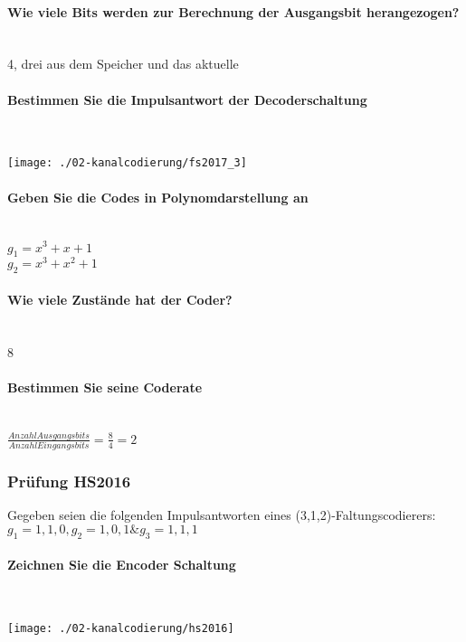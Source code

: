 \paragraph{Wie viele Bits werden zur Berechnung der Ausgangsbit herangezogen?}\mbox{}\\
4, drei aus dem Speicher und das aktuelle


\paragraph{Bestimmen Sie die Impulsantwort der Decoderschaltung}\mbox{}\\
\begin{center}
    \vspace{-8pt}
    \texttt{[image: ./02-kanalcodierung/fs2017\_3]}
    \vspace{-8pt}
\end{center}

\paragraph{Geben Sie die Codes in Polynomdarstellung an}\mbox{}\\
$g_1=x^3+x+1$\\
$g_2=x^3+x^2+1$

\paragraph{Wie viele Zustände hat der Coder?}\mbox{}\\
8

\paragraph{Bestimmen Sie seine Coderate}\mbox{}\\
$\frac{Anzahl Ausgangsbits}{Anzahl Eingangsbits} = \frac{8}{4}=2$\\

\subsubsection{Prüfung HS2016}
Gegeben seien die folgenden Impulsantworten eines (3,1,2)-Faltungscodierers:\\
${g_1}={1,1,0}, {g_2}={1,0,1} \& {g_3}={1,1,1}$\\

\paragraph{Zeichnen Sie die Encoder Schaltung}\mbox{}\\
\begin{center}
    \vspace{-8pt}
    \texttt{[image: ./02-kanalcodierung/hs2016]}
    \vspace{-8pt}
\end{center}

